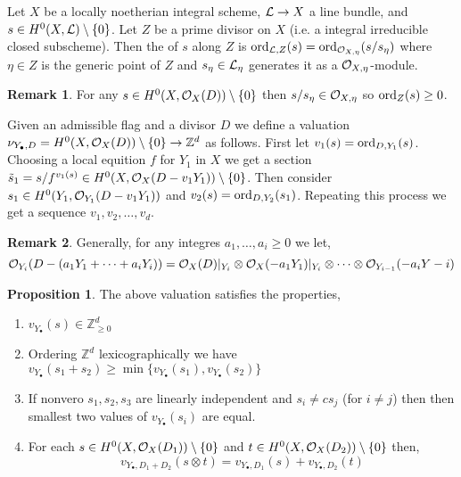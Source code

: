 \documentclass[12pt]{extarticle}
\newcommand{\Z}{\mathbb{Z}}
\theoremstyle{definition}
\newtheorem{proposition}[theorem]{Proposition}
\newtheorem{remark}{Remark}
\newenvironment{definition}[1][Definition:]{\begin{trivlist}
\item[\hskip \labelsep {\bfseries #1}]}{\end{trivlist}}
\begin{document}
\begin{definition}
Let $X$ be a locally noetherian integral scheme, $\mathcal{L} \to X$ a line bundle, and $s \in H^0(X, \mathcal{L}) \setminus \{ 0 \}$. Let $Z$ be a prime divisor on $X$ (i.e. a integral irreducible closed subscheme). Then the  of $s$ along $Z$ is $\mathrm{ord}_{\mathcal{L},Z}(s) = \mathrm{ord}_{\mathcal{O}_{X, \eta}}(s / s_\eta)$ where $\eta \in Z$ is the generic point of $Z$ and $s_\eta \in \mathcal{L}_\eta$ generates it as a $\mathcal{O}_{X, \eta}$-module.
\end{definition}

\begin{remark}
For any $s \in H^0(X, \mathcal{O}_{X}(D)) \setminus \{ 0 \}$ then $s / s_\eta \in \mathcal{O}_{X, \eta}$ so $\mathrm{ord}_Z(s) \ge 0$. 
\end{remark}

\begin{definition}
Given an admissible flag and a divisor $D$ we define a valuation $\nu_{Y_\bullet, D} = H^0(X, \struct{X}(D)) \setminus \{ 0 \} \to \Z^d$ as follows. First let $v_1(s) = \mathrm{ord}_{D, Y_1}(s)$. Choosing a local equition $f$ for $Y_1$ in $X$ we get a section $\tilde{s}_1 = s / f^{v_1(s)} \in H^0(X, \mathcal{O}_{X}(D - v_1 Y_1)) \setminus \{ 0 \}$. Then consider $s_1 \in H^0(Y_1, \mathcal{O}_{Y_1}(D - v_1 Y_1))$ and $v_2(s) = \mathrm{ord}_{D, Y_2}(s_1)$. Repeating this process we get a sequence $v_1, v_2, \dots, v_d$. 
\end{definition}

\begin{remark}
Generally, for any integres $a_1, \dots, a_i \ge 0$ we let,
\[ \mathcal{O}_{Y_i}(D - (a_1 Y_1 + \cdots + a_i Y_i)) = \mathcal{O}_{X}(D)|_{Y_i} \otimes \mathcal{O}_{X}(-a_1 Y_1) |_{Y_i} \otimes \cdots \otimes \mathcal{O}_{Y_{i-1}}(-a_i Y-i) \] 
\end{remark}

\begin{proposition}
The above valuation satisfies the properties,
\begin{enumerate}
\item $v_{Y_\bullet}(s) \in \Z_{\ge 0}^d$
\item Ordering $\Z^d$ lexicographically we have $v_{Y_\bullet}(s_1 + s_2) \ge \min{ \{ v_{Y_\bullet}(s_1), v_{Y_\bullet}(s_2) \} }$
\item If nonvero $s_1, s_2, s_3$ are linearly independent and $s_i \neq c s_j$ (for $i \neq j$) then then smallest two values of $v_{Y_\bullet}(s_i)$ are equal.
\item For each $s \in H^0(X, \mathcal{O}_{X}(D_1)) \setminus \{ 0 \}$ and $t \in H^0(X, \mathcal{O}_{X}(D_2)) \setminus \{ 0 \}$ then,
\[ v_{Y_\bullet, D_1 + D_2}(s \otimes t) = v_{Y_\bullet, D_1}(s) + v_{Y_\bullet, D_2}(t) \]
\end{enumerate}
\end{proposition}
\end{document}
